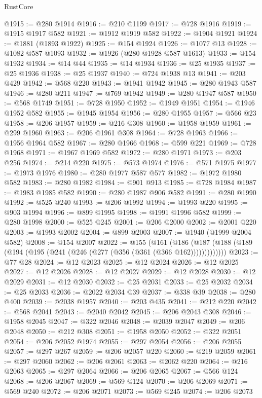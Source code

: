 \begin{lexlean}{RustCore}
\begin{coremodule}
@1915 := @280 @1914
@1916 := @210 @1199
@1917 := @728 @1916
@1919 := @1915 @1917 @582
@1921 := @1912 @1919 @582
@1922 := @1904 @1921
@1924 := @1881 (@1893 @1922)
@1925 := @154 @1924
@1926 := @1077 @13
@1928 := @1082 @587 @1093
@1932 := @1926 (@280 @1928 @587 @1613)
@1933 := @154 @1932
@1934 := @14 @44
@1935 := @14 @1934
@1936 := @25 @1935
@1937 := @25 @1936
@1938 := @25 @1937
@1940 := @724 @1938 @13
@1941 := @203 @429
@1942 := @568 @220
@1943 := @1941 @1942
@1945 := @280 @1943 @587
@1946 := @280 @211
@1947 := @769 @1942
@1949 := @280 @1947 @587
@1950 := @568 @1749
@1951 := @728 @1950
@1952 := @1949 @1951
@1954 := @1946 @1952 @582
@1955 := @1945 @1954
@1956 := @280 @1955
@1957 := @566 @23
@1958 := @206 @1957
@1959 := @216 @308
@1960 := @1958 @1959
@1961 := @299 @1960
@1963 := @206 @1961 @308
@1964 := @728 @1963
@1966 := @1956 @1964 @582
@1967 := @280 @1966
@1968 := @599 @221
@1969 := @728 @1968
@1971 := @1967 @1969 @582
@1972 := @280 @1971
@1973 := @203 @256
@1974 := @214 @220
@1975 := @573 @1974
@1976 := @571 @1975
@1977 := @1973 @1976
@1980 := @280 @1977 @587 @577
@1982 := @1972 @1980 @582
@1983 := @280 @1982
@1984 := @901 @913
@1985 := @728 @1984
@1987 := @1983 @1985 @582
@1990 := @280 @1987 @906 @582
@1991 := @280 @1990
@1992 := @525 @240
@1993 := @206 @1992
@1994 := @1993 @220
@1995 := @903 @1994
@1996 := @899 @1995
@1998 := @1991 @1996 @582
@1999 := @280 @1998
@2000 := @525 @245
@2001 := @206 @2000
@2002 := @2001 @220
@2003 := @1993 @2002
@2004 := @899 @2003
@2007 := @1940 (@1999 @2004 @582)
@2008 := @154 @2007
@2022 := @155
    (@161 (@186 (@187 (@188 (@189 (@194 (@195 (@241 (@246 (@277 (@356 (@361 (@366 @162)))))))))))))
@2023 := @77 @28
@2024 := @12 @2023
@2025 := @12 @2024
@2026 := @12 @2025
@2027 := @12 @2026
@2028 := @12 @2027
@2029 := @12 @2028
@2030 := @12 @2029
@2031 := @12 @2030
@2032 := @25 @2031
@2033 := @25 @2032
@2034 := @25 @2033
@2036 := @2022 @2034 @39
@2037 := @338 @39
@2038 := @280 @400
@2039 := @2038 @1957
@2040 := @203 @435
@2041 := @212 @220
@2042 := @568 @2041
@2043 := @2040 @2042
@2045 := @206 @2043 @308
@2046 := @1958 @2045
@2047 := @322 @2046
@2048 := @2039 @2047
@2049 := @206 @2048
@2050 := @212 @308
@2051 := @1958 @2050
@2052 := @322 @2051
@2054 := @206 @2052 @1974
@2055 := @297 @2054
@2056 := @206 @2055
@2057 := @297 @267
@2059 := @206 @2057 @220
@2060 := @219 @2059
@2061 := @297 @2060
@2062 := @206 @2061
@2063 := @2062 @220
@2064 := @216 @2063
@2065 := @297 @2064
@2066 := @206 @2065
@2067 := @566 @124
@2068 := @206 @2067
@2069 := @569 @124
@2070 := @206 @2069
@2071 := @569 @240
@2072 := @206 @2071
@2073 := @569 @245
@2074 := @206 @2073

\end{coremodule}
\end{lexlean}

